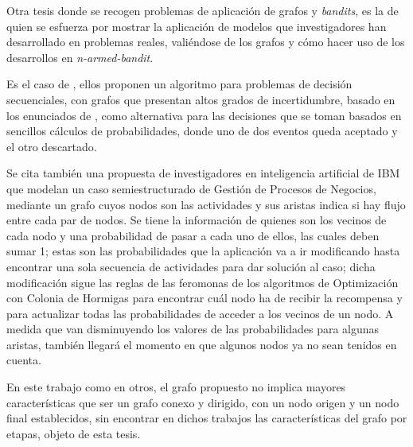 Otra tesis donde se recogen problemas de aplicación de grafos y \textit{bandits}, es la de \citet{valko2016bandits} quien se esfuerza por mostrar la aplicación de modelos que investigadores han desarrollado en problemas reales, valiéndose de los grafos y cómo hacer uso de los desarrollos en \textit{n-armed-bandit}.

Es el caso de \cite{tossou2017thompson}, ellos proponen un algoritmo para problemas de decisión secuenciales, con grafos que presentan altos grados de incertidumbre, basado en los enunciados de \citet{thompson1933likelihood}, como alternativa para las decisiones que se toman basados en sencillos cálculos de probabilidades, donde uno de dos eventos queda aceptado y el otro descartado. 

Se cita también una propuesta de investigadores en inteligencia artificial de IBM \citep{lakshmanan2010predictive} que modelan un caso semiestructurado de Gestión de Procesos de Negocios, mediante un grafo cuyos nodos son las actividades y sus aristas indica si hay flujo entre cada par de nodos. Se tiene la información de quienes son los vecinos de cada nodo y una probabilidad de pasar a cada uno de ellos, las cuales deben sumar 1; estas son las probabilidades que la aplicación va a ir modificando hasta encontrar una sola secuencia de actividades para dar solución al caso; dicha modificación sigue las reglas de las feromonas de los algoritmos de Optimización con Colonia de Hormigas para encontrar cuál nodo ha de recibir la recompensa y para actualizar todas las probabilidades de acceder a los vecinos de un nodo. A medida que van disminuyendo los valores de las probabilidades para algunas aristas, también llegará el momento en que algunos nodos ya no sean tenidos en cuenta.

En este trabajo como en otros, el grafo propuesto no implica mayores características que ser un grafo conexo y dirigido, con un nodo origen y un nodo final establecidos, sin encontrar en dichos trabajos las características del grafo por etapas, objeto de esta tesis. 

